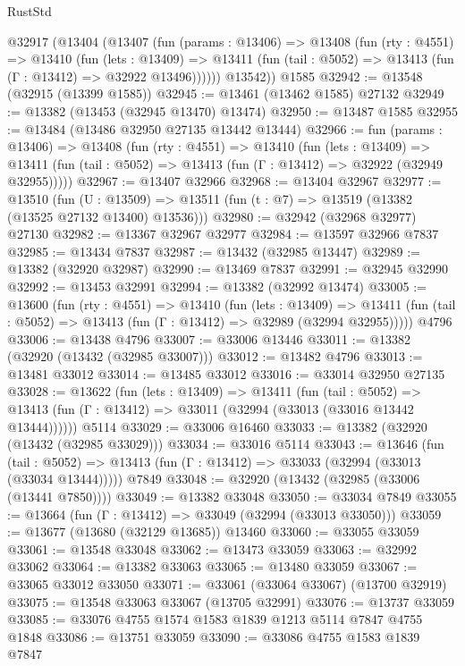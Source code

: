 \begin{lexlean}{RustStd}
\begin{coremodule}
    @32917
      (@13404
        (@13407
          (fun (params : @13406) =>
          @13408
            (fun (rty : @4551) =>
            @13410
              (fun (lets : @13409) =>
              @13411 (fun (tail : @5052) => @13413 (fun (Γ : @13412) => @32922 @13496))))))
        @13542))
    @1585
@32942 := @13548 (@32915 (@13399 @1585))
@32945 := @13461 (@13462 @1585) @27132
@32949 := @13382 (@13453 (@32945 @13470) @13474)
@32950 := @13487 @1585
@32955 := @13484 (@13486 @32950 @27135 @13442 @13444)
@32966 := fun (params : @13406) =>
  @13408
    (fun (rty : @4551) =>
    @13410
      (fun (lets : @13409) =>
      @13411 (fun (tail : @5052) => @13413 (fun (Γ : @13412) => @32922 (@32949 @32955)))))
@32967 := @13407 @32966
@32968 := @13404 @32967
@32977 := @13510
    (fun (U : @13509) => @13511 (fun (t : @7) => @13519 (@13382 (@13525 @27132 @13400) @13536)))
@32980 := @32942 (@32968 @32977) @27130
@32982 := @13367 @32967 @32977
@32984 := @13597 @32966 @7837
@32985 := @13434 @7837
@32987 := @13432 (@32985 @13447)
@32989 := @13382 (@32920 @32987)
@32990 := @13469 @7837
@32991 := @32945 @32990
@32992 := @13453 @32991
@32994 := @13382 (@32992 @13474)
@33005 := @13600
    (fun (rty : @4551) =>
    @13410
      (fun (lets : @13409) =>
      @13411 (fun (tail : @5052) => @13413 (fun (Γ : @13412) => @32989 (@32994 @32955)))))
    @4796
@33006 := @13438 @4796
@33007 := @33006 @13446
@33011 := @13382 (@32920 (@13432 (@32985 @33007)))
@33012 := @13482 @4796
@33013 := @13481 @33012
@33014 := @13485 @33012
@33016 := @33014 @32950 @27135
@33028 := @13622
    (fun (lets : @13409) =>
    @13411
      (fun (tail : @5052) =>
      @13413 (fun (Γ : @13412) => @33011 (@32994 (@33013 (@33016 @13442 @13444))))))
    @5114
@33029 := @33006 @16460
@33033 := @13382 (@32920 (@13432 (@32985 @33029)))
@33034 := @33016 @5114
@33043 := @13646
    (fun (tail : @5052) => @13413 (fun (Γ : @13412) => @33033 (@32994 (@33013 (@33034 @13444)))))
    @7849
@33048 := @32920 (@13432 (@32985 (@33006 (@13441 @7850))))
@33049 := @13382 @33048
@33050 := @33034 @7849
@33055 := @13664 (fun (Γ : @13412) => @33049 (@32994 (@33013 @33050)))
@33059 := @13677 (@13680 (@32129 @13685)) @13460
@33060 := @33055 @33059
@33061 := @13548 @33048
@33062 := @13473 @33059
@33063 := @32992 @33062
@33064 := @13382 @33063
@33065 := @13480 @33059
@33067 := @33065 @33012 @33050
@33071 := @33061 (@33064 @33067) (@13700 @32919)
@33075 := @13548 @33063 @33067 (@13705 @32991)
@33076 := @13737 @33059
@33085 := @33076 @4755 @1574 @1583 @1839 @1213 @5114 @7847 @4755 @1848
@33086 := @13751 @33059
@33090 := @33086 @4755 @1583 @1839 @7847

\end{coremodule}
\end{lexlean}
